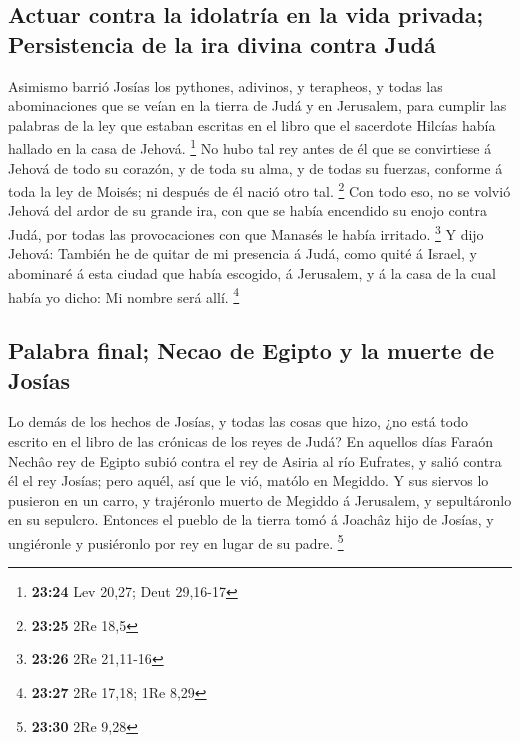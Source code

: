 \hypertarget{actuar-contra-la-idolatruxeda-en-la-vida-privada-persistencia-de-la-ira-divina-contra-juduxe1}{%
\subsection{Actuar contra la idolatría en la vida privada; Persistencia
de la ira divina contra
Judá}\label{actuar-contra-la-idolatruxeda-en-la-vida-privada-persistencia-de-la-ira-divina-contra-juduxe1}}

 Asimismo barrió Josías los pythones, adivinos, y
terapheos, y todas las abominaciones que se veían en la tierra de Judá y
en Jerusalem, para cumplir las palabras de la ley que estaban escritas
en el libro que el sacerdote Hilcías había hallado en la casa de Jehová.
\footnote{\textbf{23:24} Lev 20,27; Deut 29,16-17}  No
hubo tal rey antes de él que se convirtiese á Jehová de todo su corazón,
y de toda su alma, y de todas su fuerzas, conforme á toda la ley de
Moisés; ni después de él nació otro tal. \footnote{\textbf{23:25} 2Re
  18,5}  Con todo eso, no se volvió Jehová del ardor de
su grande ira, con que se había encendido su enojo contra Judá, por
todas las provocaciones con que Manasés le había irritado. \footnote{\textbf{23:26}
  2Re 21,11-16}  Y dijo Jehová: También he de quitar de
mi presencia á Judá, como quité á Israel, y abominaré á esta ciudad que
había escogido, á Jerusalem, y á la casa de la cual había yo dicho: Mi
nombre será allí. \footnote{\textbf{23:27} 2Re 17,18; 1Re 8,29}

\hypertarget{palabra-final-necao-de-egipto-y-la-muerte-de-josuxedas}{%
\subsection{Palabra final; Necao de Egipto y la muerte de
Josías}\label{palabra-final-necao-de-egipto-y-la-muerte-de-josuxedas}}

 Lo demás de los hechos de Josías, y todas las cosas que
hizo, ¿no está todo escrito en el libro de las crónicas de los reyes de
Judá?  En aquellos días Faraón Nechâo rey de Egipto subió
contra el rey de Asiria al río Eufrates, y salió contra él el rey
Josías; pero aquél, así que le vió, matólo en Megiddo.  Y
sus siervos lo pusieron en un carro, y trajéronlo muerto de Megiddo á
Jerusalem, y sepultáronlo en su sepulcro. Entonces el pueblo de la
tierra tomó á Joachâz hijo de Josías, y ungiéronle y pusiéronlo por rey
en lugar de su padre. \footnote{\textbf{23:30} 2Re 9,28}


